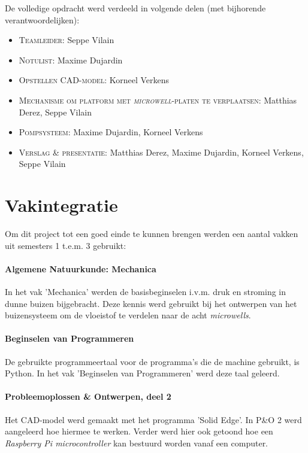 \documentclass[a4paper,twoside,kulak]{kulakreport} %
\begin{document}
De volledige opdracht werd verdeeld in volgende delen (met bijhorende verantwoordelijken):
\begin{itemize}
	\item \textsc{Teamleider:} Seppe Vilain
	\item \textsc{Notulist}: Maxime Dujardin
	\item \textsc{Opstellen CAD-model}: Korneel Verkens
	\item \textsc{Mechanisme om platform met \textit{microwell}-platen te verplaatsen:} Matthias Derez, Seppe Vilain
	\item \textsc{Pompsysteem:} Maxime Dujardin, Korneel Verkens
	\item \textsc{Verslag \& presentatie:} Matthias Derez, Maxime Dujardin, Korneel Verkens, Seppe Vilain
	
\end{itemize}

\clearpage

\section*{Vakintegratie}
Om dit project tot een goed einde te kunnen brengen werden een aantal vakken uit semesters 1 t.e.m. 3 gebruikt:

\paragraph{Algemene Natuurkunde: Mechanica}

In het vak 'Mechanica' werden de basisbeginselen i.v.m. druk en stroming in dunne buizen bijgebracht. Deze kennis werd gebruikt bij het ontwerpen van het buizensysteem om de vloeistof te verdelen naar de acht \textit{microwells}.

\paragraph{Beginselen van Programmeren}

De gebruikte programmeertaal voor de programma's die de machine gebruikt, is Python. In het vak 'Beginselen van Programmeren' werd deze taal geleerd. 

\paragraph{Probleemoplossen \& Ontwerpen, deel 2}

Het CAD-model werd gemaakt met het programma 'Solid Edge'. In P\&O 2 werd aangeleerd hoe hiermee te werken. Verder werd hier ook getoond hoe een \textit{Raspberry Pi microcontroller} kan bestuurd worden vanaf een computer. 
\end{document}

